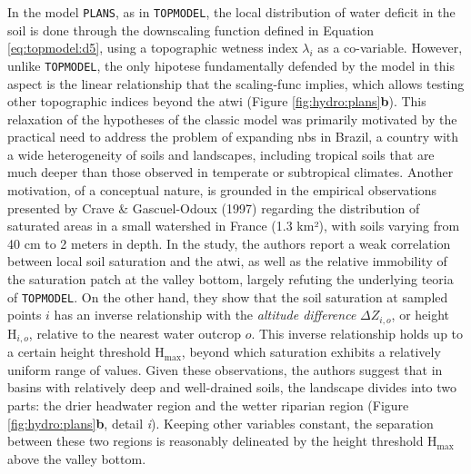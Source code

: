 \documentclass[./main_en.tex]{subfiles}
\begin{document}
\par In the \gls{model} \texttt{PLANS}, as in \texttt{TOPMODEL}, the local distribution of water deficit in the soil is done through the \gls{downscaling} function defined in Equation \ref{eq:topmodel:d5}, using a topographic wetness index $\lambda_{i}$ as a co-variable. However, unlike \texttt{TOPMODEL}, the only \gls{hipotese} fundamentally defended by the \gls{model} in this aspect is the linear relationship that the \gls{scaling-func} implies, which allows testing other topographic indices beyond the \acrshort{atwi} (Figure \ref{fig:hydro:plans}\textbf{b}). This relaxation of the hypotheses of the classic \gls{model} was primarily motivated by the practical need to address the problem of expanding \acrshort{nbs} in Brazil, a country with a wide heterogeneity of soils and landscapes, including tropical soils that are much deeper than those observed in temperate or subtropical climates. Another motivation, of a conceptual nature, is grounded in the empirical observations presented by Crave \& Gascuel-Odoux (1997) \cite{Crave1997a} regarding the distribution of saturated areas in a small watershed in France (1.3 km²), with soils varying from 40 cm to 2 meters in depth. In the study, the authors report a weak correlation between local soil saturation and the \acrshort{atwi}, as well as the relative immobility of the saturation patch at the valley bottom, largely refuting the underlying \gls{teoria} of \texttt{TOPMODEL}. On the other hand, they show that the soil saturation at sampled points $i$ has an inverse relationship with the \textit{altitude difference} $\Delta Z_{i, o}$, or height $\text{H}_{i, o}$, relative to the nearest water outcrop $o$. This inverse relationship holds up to a certain height threshold $\text{H}_\text{max}$, beyond which saturation exhibits a relatively uniform range of values. Given these observations, the authors suggest that in basins with relatively deep and well-drained soils, the landscape divides into two parts: the drier headwater region and the wetter riparian region (Figure \ref{fig:hydro:plans}\textbf{b}, detail \textit{i}). Keeping other variables constant, the separation between these two regions is reasonably delineated by the height threshold $\text{H}_\text{max}$ above the valley bottom.
\end{document}
